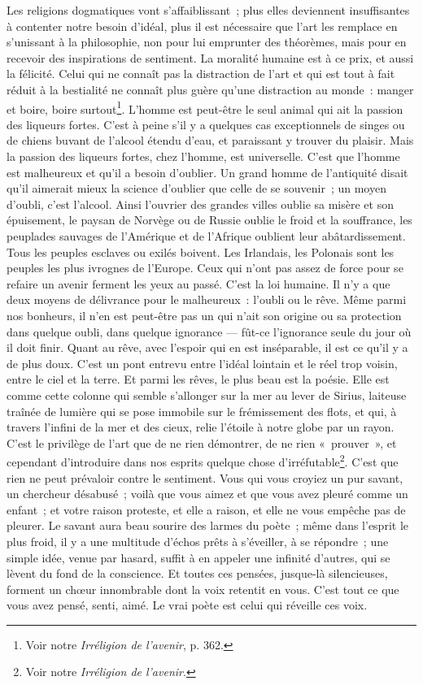 \documentclass[french,twoside]{book} %
\begin{document}
\noindent Les religions dogmatiques vont s’affaiblissant ; plus elles deviennent insuffisantes à contenter notre besoin d’idéal, plus il est nécessaire que l’art les remplace en s’unissant à la philosophie, non pour lui emprunter des théorèmes, mais pour en recevoir des inspirations de sentiment. La moralité humaine est à ce prix, et aussi la félicité. Celui qui ne connaît pas la distraction de l’art et qui est tout à fait réduit à la bestialité ne connaît plus guère qu’une distraction au monde : manger et boire, boire surtout\footnote{ Voir notre \emph{Irréligion de l’avenir}, p. 362.}. L’homme est peut-être le seul animal qui ait la passion des liqueurs fortes. C’est à peine s’il y a quelques cas exceptionnels de singes ou de chiens buvant de l’alcool étendu d’eau, et paraissant y trouver du plaisir. Mais la passion des liqueurs fortes, chez l’homme, est universelle. C’est que l’homme est malheureux et qu’il a besoin d’oublier. Un grand homme de l’antiquité disait qu’il aimerait mieux la science d’oublier que celle de se souvenir ; un moyen d’oubli, c’est l’alcool. Ainsi l’ouvrier des grandes villes oublie sa misère et son épuisement, le paysan de Norvège ou de Russie oublie le froid et la souffrance, les peuplades sauvages de l’Amérique et de l’Afrique oublient leur abâtardissement. Tous les peuples esclaves ou exilés boivent. Les Irlandais, les Polonais sont les peuples les plus ivrognes de l’Europe. Ceux qui n’ont pas assez de force pour se refaire un avenir ferment les yeux au passé. C’est la loi humaine. Il n’y a que deux moyens de délivrance pour le malheureux : l’oubli ou le rêve. Même parmi nos bonheurs, il n’en est peut-être pas un qui n’ait son origine ou sa protection dans quelque oubli, dans quelque ignorance — fût-ce l’ignorance seule du jour où il doit finir. Quant au rêve, avec l’espoir qui en est inséparable, il est ce qu’il y a de plus doux. C’est un pont entrevu entre l’idéal lointain et le réel trop voisin, entre le ciel et la terre. Et parmi les rêves, le plus beau est la poésie. Elle est comme cette colonne qui semble s’allonger sur la mer au lever de Sirius, laiteuse traînée de lumière qui se pose immobile sur le frémissement des flots, et qui, à travers l’infini de la mer et des cieux, relie l’étoile à notre globe par un rayon. C’est le privilège de l’art que de ne rien démontrer, de ne rien « prouver », et cependant d’introduire dans nos esprits quelque chose d’irréfutable\footnote{ Voir notre \emph{Irréligion de l’avenir}.}. C’est que rien ne peut prévaloir contre le sentiment. Vous qui vous croyiez un pur savant, un chercheur désabusé ; voilà que vous aimez et que vous avez pleuré comme un enfant ; et votre raison proteste, et elle a raison, et elle ne vous empêche pas de pleurer. Le savant aura beau sourire des larmes du poète ; même dans l’esprit le plus froid, il y a une multitude d’échos prêts à s’éveiller, à se répondre ; une simple idée, venue par hasard, suffit à en appeler une infinité d’autres, qui se lèvent du fond de la conscience. Et toutes ces pensées, jusque-là silencieuses, forment un chœur innombrable dont la voix retentit en vous. C’est tout ce que vous avez pensé, senti, aimé. Le vrai poète est celui qui réveille ces voix.\par
\end{document}

